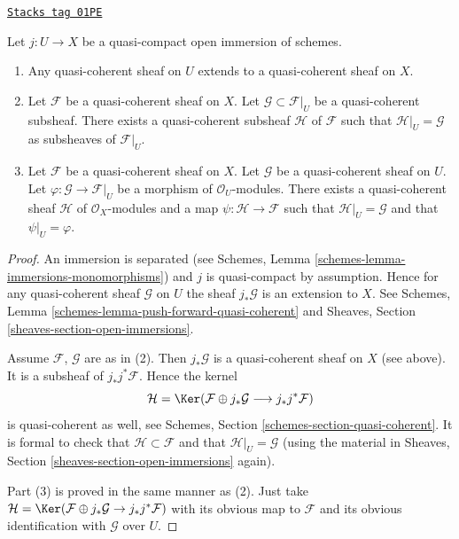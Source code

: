\begin{lemma}
\label{properties-lemma-extend-trivial}
\href{https://stacks.math.columbia.edu/tag/01PE}{\texttt{Stacks tag 01PE}}

Let $j : U \to X$ be a quasi-compact open immersion of schemes.
\begin{enumerate}
\item Any quasi-coherent sheaf on $U$ extends to a quasi-coherent
sheaf on $X$.
\item Let $\mathcal{F}$ be a quasi-coherent sheaf on $X$.
Let $\mathcal{G} \subset \mathcal{F}|_U$ be a quasi-coherent
subsheaf. There exists a quasi-coherent subsheaf $\mathcal{H}$ of
$\mathcal{F}$ such that $\mathcal{H}|_U = \mathcal{G}$
as subsheaves of $\mathcal{F}|_U$.
\item Let $\mathcal{F}$ be a quasi-coherent sheaf on $X$.
Let $\mathcal{G}$ be a quasi-coherent sheaf on $U$.
Let $\varphi : \mathcal{G} \to \mathcal{F}|_U$ be a morphism
of $\mathcal{O}_U$-modules. There exists a quasi-coherent sheaf $\mathcal{H}$
of $\mathcal{O}_X$-modules and a map $\psi : \mathcal{H} \to \mathcal{F}$
such that $\mathcal{H}|_U = \mathcal{G}$ and that
$\psi|_U = \varphi$.
\end{enumerate}
\end{lemma}

\begin{proof}
An immersion is separated
(see Schemes, Lemma \ref{schemes-lemma-immersions-monomorphisms})
and $j$ is quasi-compact by assumption.
Hence for any quasi-coherent sheaf $\mathcal{G}$ on $U$ the sheaf
$j_*\mathcal{G}$ is an extension to $X$. See
Schemes, Lemma \ref{schemes-lemma-push-forward-quasi-coherent} and
Sheaves, Section \ref{sheaves-section-open-immersions}.

\medskip\noindent
Assume $\mathcal{F}$, $\mathcal{G}$ are as in (2).
Then $j_*\mathcal{G}$ is a quasi-coherent sheaf on $X$ (see above).
It is a subsheaf of $j_*j^*\mathcal{F}$.
Hence the kernel
$$
\mathcal{H} =
\Ker(\mathcal{F} \oplus j_* \mathcal{G}
\longrightarrow j_*j^*\mathcal{F})
$$
is quasi-coherent as well, see
Schemes, Section \ref{schemes-section-quasi-coherent}.
It is formal to check that $\mathcal{H} \subset \mathcal{F}$ and that
$\mathcal{H}|_U = \mathcal{G}$ (using the material in
Sheaves, Section \ref{sheaves-section-open-immersions} again).

\medskip\noindent
Part (3) is proved in the same manner as (2). Just take
$\mathcal{H} = \Ker(\mathcal{F} \oplus j_* \mathcal{G}
\to j_*j^*\mathcal{F})$ with its obvious map to $\mathcal{F}$
and its obvious identification with $\mathcal{G}$ over $U$.
\end{proof}


